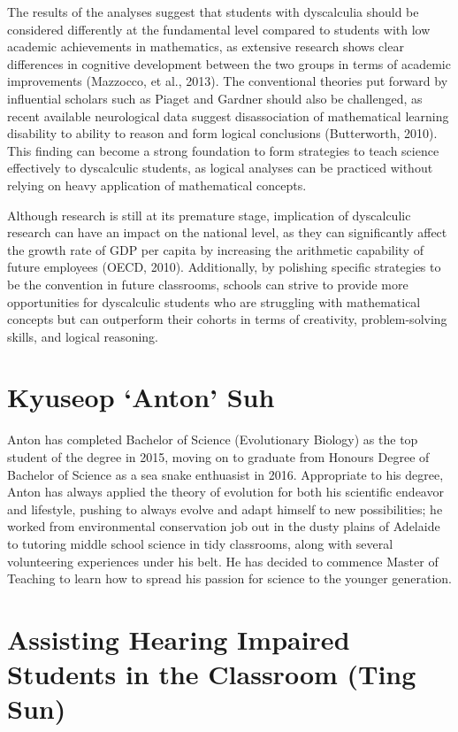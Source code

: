 \documentclass[twoside,12pt,a4paper,notitlepage]{memoir}
\begin{document}
The results of the analyses suggest that students with dyscalculia should be considered differently at the fundamental level compared to students with low academic achievements in mathematics, as extensive research shows clear differences in cognitive development between the two groups in terms of academic improvements (Mazzocco, et al., 2013). The conventional theories put forward by influential scholars such as Piaget and Gardner should also be challenged, as recent available neurological data suggest disassociation of mathematical learning disability to ability to reason and form logical conclusions (Butterworth, 2010). This finding can become a strong foundation to form strategies to teach science effectively to dyscalculic students, as logical analyses can be practiced without relying on heavy application of mathematical concepts.

Although research is still at its premature stage, implication of dyscalculic research can have an impact on the national level, as they can significantly affect the growth rate of GDP per capita by increasing the arithmetic capability of future employees (OECD, 2010). Additionally, by polishing specific strategies to be the convention in future classrooms, schools can strive to provide more opportunities for dyscalculic students who are struggling with mathematical concepts but can outperform their cohorts in terms of creativity, problem-solving skills, and logical reasoning.

\section*{Kyuseop `Anton' Suh}

Anton has completed Bachelor of Science (Evolutionary Biology) as the top student of the degree in 2015, moving on to graduate from Honours Degree of Bachelor of Science as a sea snake enthuasist in 2016. Appropriate to his degree, Anton has always applied the theory of evolution for both his scientific endeavor and lifestyle, pushing to always evolve and adapt himself to new possibilities; he worked from environmental conservation job out in the dusty plains of Adelaide to tutoring middle school science in tidy classrooms, along with several volunteering experiences under his belt. He has decided to commence Master of Teaching to learn how to spread his passion for science to the younger generation.



\pagebreak
\section*{Assisting Hearing Impaired Students in the Classroom (Ting Sun)}
\label{aut:sun}
\end{document}
